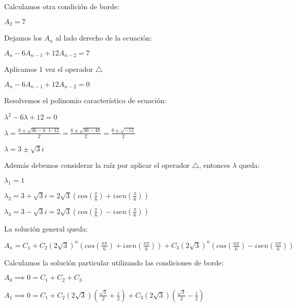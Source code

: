 \begin{solution}
  Calculamos otra condición de borde:
  \begin{center}
      $A_2 = 7$
  \end{center}
  
  Dejamos los $A_n$ al lado derecho de la ecuación:
  \begin{center}
      $A_n - 6A_{n-1} + 12A_{n-2} = 7$ 
      
      Aplicamos 1 vez el operador  $\bigtriangleup$
      
      $A_n - 6A_{n-1} + 12A_{n-2} = 0$ 
  \end{center}
  
  Resolvemos el polinomio característico de ecuación:
  \begin{center}
      $\lambda^2 - 6\lambda + 12 = 0$
      
      $\lambda = \frac{6 \pm \sqrt{36 - 4\cdot1\cdot12}}{2} = \frac{6 \pm \sqrt{36 - 48}}{2} = \frac{6 \pm \sqrt{-12}}{2}$
      
      $\lambda = 3 \pm \sqrt{3}i$
      
      Además debemos considerar la raíz por aplicar el operador $\bigtriangleup$, entonces $\lambda$ queda:
      
      $\lambda_1 = 1$
      
      $\lambda_2 = 3 + \sqrt{3}i = 2\sqrt{3}(cos(\frac{\pi}{6}) + isen(\frac{\pi}{6}))$
      
      $\lambda_3 = 3 - \sqrt{3}i = 2\sqrt{3}(cos(\frac{\pi}{6}) - isen(\frac{\pi}{6}))$
  \end{center}
  
  La solución general queda:
  \begin{center}
      $A_n = C_1 + C_2(2\sqrt{3})^n(cos(\frac{n\pi}{6}) + isen(\frac{n\pi}{6})) + C_3(2\sqrt{3})^n(cos(\frac{n\pi}{6}) - isen(\frac{n\pi}{6}))$
  \end{center}
  
  Calculamos la solución particular utilizando las condiciones de borde:
  \begin{center}
      $A_0 \implies 0 = C_1 + C_2 + C_3$
      
      $A_1 \implies 0 = C_1 + C_2(2\sqrt{3})(\frac{\sqrt{3}}{2} + \frac{i}{2}) + C_3(2\sqrt{3})(\frac{\sqrt{3}}{2} - \frac{i}{2})$
      

\end{center}
\end{solution}
